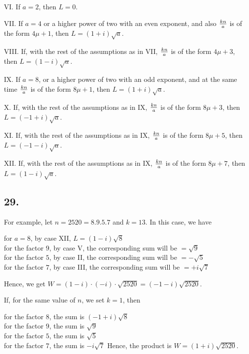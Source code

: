 \documentclass[twoside,12pt]{memoir}
\renewenvironment{quote}%
  {\list{}{\leftmargin=5em\rightmargin=0em}\item[]}%
  {\endlist}
\let\oldfrac\frac
\def\frac#1#2{\mathchoice{\tfrac{#1}{#2}}{\oldfrac{#1}{#2}}{\genfrac{}{}{}{2}{#1}{#2\mathstrut}}{\genfrac{}{}{}{3}{#1}{#2\mathstrut}}}
\begin{document}
VI. If \(a=2\), then \(L=0\).

VII. If \(a=4\) or a higher power of two with an even exponent, and also \(\frac{k n}{a}\) is of the form \(4 \mu+1\), then \(L=(1+i) \sqrt{a}\).

VIII. If, with the rest of the assumptions as in VII, \(\frac{k n}{a}\) is of the form \(4 \mu+3\), then \(L=(1-i) \sqrt{a}\).

IX. If \(a=8\), or a higher power of two with an odd exponent, and at the same time \(\frac{k n}{a}\) is of the form \(8 \mu+1\), then \(L=(1+i) \sqrt{a}\).\pagebreak%

X. If, with the rest of the assumptions as in IX, \(\frac{k n}{a}\) is of the form \(8 \mu+3\), then \(L=(-1+i) \sqrt{a}\).

XI. If, with the rest of the assumptions as in IX, \(\frac{k n}{a}\) is of the form \(8 \mu+5\), then \(L=(-1-i) \sqrt{a}\).

XII. If, with the rest of the assumptions as in IX, \(\frac{k n}{a}\) is of the form \(8 \mu+7\), then \(L=(1-i) \sqrt{a}\).

\subsection*{29.}

For example, let \(n=2520=8 . 9 . 5 . 7\) and \(k=13\). In this case, we have
\begin{quote}
for \(a=8\), by case XII, \(L=(1-i) \sqrt{8}\)\\
for the factor \(9\), by case V, the corresponding sum will be \(=\sqrt{9}\)\\
for the factor \(5\), by case II, the corresponding sum will be \(=-\sqrt{5}\)\\
for the factor \(7\), by case III, the corresponding sum will be \(=+i \sqrt{7}\)
\end{quote}

Hence, we get \(W=(1-i) \cdot(-i) \cdot \sqrt{2520}=(-1-i) \sqrt{2520}\).

If, for the same value of \(n \), we set \(k = 1 \), then 
\begin{quote}
for the factor \(8\), the sum is \((-1+i) \sqrt{8}\)\\
for the factor \(9\), the sum is \(\sqrt{9}\)\\
for the factor \(5\), the sum is \(\sqrt{5}\)\\
for the factor \(7\), the sum is \(-i \sqrt{7}\)
\end{quote}
Hence, the product is \(W = (1+i) \sqrt{2520}\).
\end{document}
